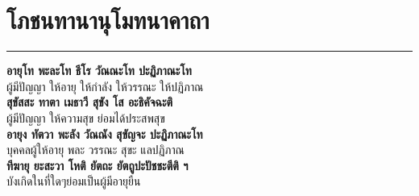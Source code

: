 \documentclass[12pt]{article}
\begin{document}
\section{โภชนทานานุโมทนาคาถา}
\hrule
\textbf{อายุโท พะละโท ธีโร วัณณะโท ปะฏิภาณะโท}\\
\indent ผู้มีปัญญา ให้อายุ ให้กำลัง ให้วรรณะ ให้ปฏิภาณ\\
\textbf{สุขัสสะ ทาตา เมธาวี สุขัง โส อะธิคัจฉะติ}\\
\indent ผู้มีปัญญา ให้ความสุข ย่อมได้ประสพสุข\\
\textbf{อายุง ทัตวา พะลัง วัณณัง สุขัญจะ ปะฏิภาณะโท}\\
\indent บุคคลผู้ให้อายุ พละ วรรณะ สุขะ แลปฏิภาณ\\
\textbf{ทีฆายุ ยะสะวา โหติ ยัตถะ ยัตถูปะปัชชะตีติ ฯ}\\
\indent บังเกิดในที่ใดๆย่อมเป็นผู้มีอายุยืน\\
\end{document}
